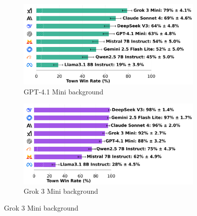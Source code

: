 \documentclass{article}
\begin{document}
\begin{figure}[htbp]
    \centering
    \begin{subfigure}[b]{0.48\textwidth}
        \centering
        \includegraphics[width=\textwidth]{../results/detective_gpt-4.1_mini_v4_1_benchmark.png}
        \caption{GPT-4.1 Mini background}
        \label{fig:detective_gpt41mini_appendix}
    \end{subfigure}
    \hfill
    \begin{subfigure}[b]{0.48\textwidth}
        \centering
        \includegraphics[width=\textwidth]{../results/detective_grok_3_mini_v4_1_benchmark.png}
        \caption{Grok 3 Mini background}
        \label{fig:detective_grok3_appendix}
    \end{subfigure}
    
    \vspace{0.5cm}
    

\end{figure}
\end{document}
